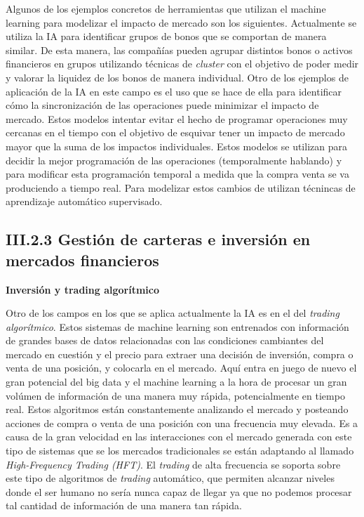 \documentclass[]{DissertateUSU}
\begin{document}
\setlength\parskip{5ex}

\noindent Algunos de los ejemplos concretos de herramientas que utilizan
el machine learning para modelizar el impacto de mercado son los
siguientes. Actualmente se utiliza la IA para identificar grupos de
bonos que se comportan de manera similar. De esta manera, las compañías
pueden agrupar distintos bonos o activos financieros en grupos
utilizando técnicas de \emph{cluster} con el objetivo de poder medir y
valorar la liquidez de los bonos de manera individual. Otro de los
ejemplos de aplicación de la IA en este campo es el uso que se hace de
ella para identificar cómo la sincronización de las operaciones puede
minimizar el impacto de mercado. Estos modelos intentar evitar el hecho
de programar operaciones muy cercanas en el tiempo con el objetivo de
esquivar tener un impacto de mercado mayor que la suma de los impactos
individuales. Estos modelos se utilizan para decidir la mejor
programación de las operaciones (temporalmente hablando) y para
modificar esta programación temporal a medida que la compra venta se va
produciendo a tiempo real. Para modelizar estos cambios de utilizan
técnincas de aprendizaje automático supervisado.

\FloatBarrier
{}
\fancyfoot[C]{\thepage}

\subsection{III.2.3 \textbf{Gestión de carteras e inversión en mercados financieros}}

\justifying

\textbf{Inversión y trading algorítmico}

\noindent Otro de los campos en los que se aplica actualmente la IA es
en el del \emph{trading algorítmico}. Estos sistemas de machine learning
son entrenados con información de grandes bases de datos relacionadas
con las condiciones cambiantes del mercado en cuestión y el precio para
extraer una decisión de inversión, compra o venta de una posición, y
colocarla en el mercado. Aquí entra en juego de nuevo el gran potencial
del big data y el machine learning a la hora de procesar un gran volúmen
de información de una manera muy rápida, potencialmente en tiempo real.
Estos algoritmos están constantemente analizando el mercado y posteando
acciones de compra o venta de una posición con una frecuencia muy
elevada. Es a causa de la gran velocidad en las interacciones con el
mercado generada con este tipo de sistemas que se los mercados
tradicionales se están adaptando al llamado \emph{High-Frequency Trading
(HFT)}. El \emph{trading} de alta frecuencia se soporta sobre este tipo
de algoritmos de \emph{trading} automático, que permiten alcanzar
niveles donde el ser humano no sería nunca capaz de llegar ya que no
podemos procesar tal cantidad de información de una manera tan rápida.
\end{document}
